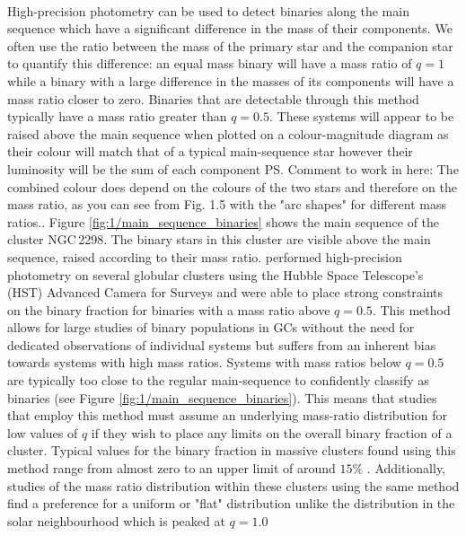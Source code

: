\paragraph{}
High-precision photometry can be used to detect binaries along the main sequence which have a
significant difference in the mass of their components. We often use the ratio between the mass of
the primary star and the companion star to quantify this difference: an equal mass binary will have
a mass ratio of $q=1$ while a binary with a large difference in the masses of its components will
have a mass ratio closer to zero. Binaries that are detectable through this method typically have a
mass ratio greater than $q=0.5$. These systems will appear to be raised above the main sequence when
plotted on a colour-magnitude diagram as their colour will match that of a typical main-sequence
star however their luminosity will be the sum of each component \ps{Comment to work in here: The
combined colour does depend on the colours of the two stars and therefore on the mass ratio, as you
can see from Fig. 1.5 with the "arc shapes" for different mass ratios.}. Figure
\ref{fig:1/main_sequence_binaries} shows the main sequence of the cluster NGC\,2298. The binary
stars in this cluster are visible above the main sequence, raised according to their mass ratio.
\citet{Milone2012} performed high-precision photometry on several globular clusters using the Hubble
Space Telescope's (HST) Advanced Camera for Surveys and were able to place strong constraints on the
binary fraction for binaries with a mass ratio above $q=0.5$. This method allows for large studies
of binary populations in GCs without the need for dedicated observations of individual systems but
suffers from an inherent bias towards systems with high mass ratios. Systems with mass ratios below
$q=0.5$ are typically too close to the regular main-sequence to confidently classify as binaries
(see Figure \ref{fig:1/main_sequence_binaries}). This means that studies that employ this method
must assume an underlying mass-ratio distribution for low values of $q$ if they wish to place any
limits on the overall binary fraction of a cluster. Typical values for the binary fraction in
massive clusters found using this method range from almost zero to an upper limit of around $15\%$
\citep{Milone2012}. Additionally, studies of the mass ratio distribution within these clusters using
the same method find a preference for a uniform or "flat" distribution unlike the distribution in
the solar neighbourhood which is peaked at $q=1.0$ \citep{Milone2012,Fisher2005}


